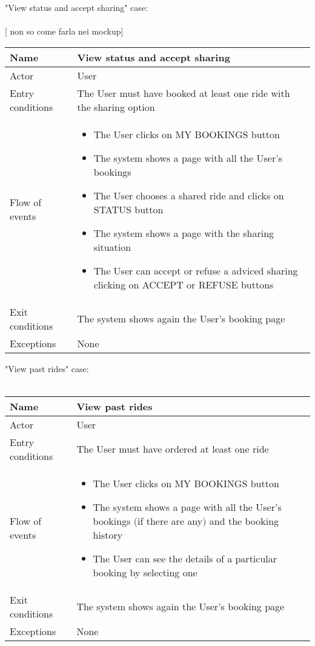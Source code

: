 \newpage
"View status and accept sharing" case:
\\
\\
$[$ non so come farla nei mockup$]$\askpippo\\
\begin{tabular}{|p{3cm}|p{10cm}|}
\hline
Name & View status and accept sharing\\
\hline
Actor & User\\
\hline
Entry conditions & The User must have booked at least one ride with the sharing option\\
\hline
Flow of events &
	\begin{itemize}
			\item The User clicks on MY BOOKINGS button
			\item The system shows a page with all the User's bookings
			\item The User chooses a shared ride and clicks on STATUS button
			\item The system shows a page with the sharing situation
			\item The User can accept or refuse a adviced sharing clicking on ACCEPT or REFUSE buttons
	\end{itemize}\\
\hline
Exit conditions & The system shows again the User's booking page\\
\hline
Exceptions & None\\
\hline
\end {tabular}

\newpage
"View past rides" case:
\\
\\
\begin{tabular}{|p{3cm}|p{10cm}|}
\hline
Name & View past rides\\
\hline
Actor & User\\
\hline
Entry conditions & The User must have ordered at least one ride\\
\hline
Flow of events &
	\begin{itemize}
		\item The User clicks on MY BOOKINGS button
		\item The system shows a page with all the User's bookings $($if there are any$)$ and the booking history
		\item The User can see the details of a particular booking by selecting one
	\end{itemize}\\

\hline
Exit conditions & The system shows again the User's booking page\\
\hline
Exceptions & None\\
\hline
\end {tabular}

